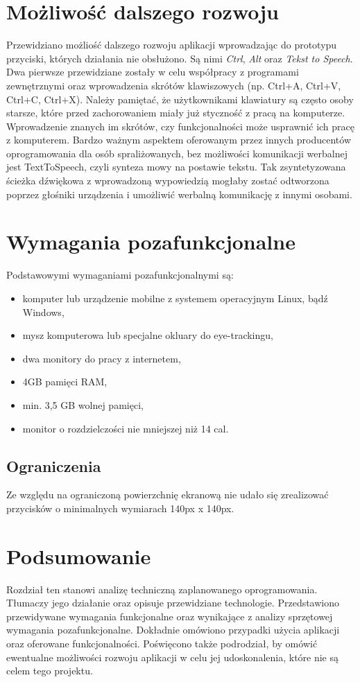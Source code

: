 \documentclass[twoside,a4paper]{book}
\begin{document}
\section{Możliwość dalszego rozwoju} \label{sec:whatMore}
Przewidziano możliość dalszego rozwoju aplikacji wprowadzając do prototypu przyciski, których działania nie obsłużono. Są nimi \textit{Ctrl}, \textit{Alt} oraz \textit{Tekst to Speech}. Dwa pierwsze przewidziane zostały w celu współpracy z programami zewnętrznymi oraz wprowadzenia  skrótów klawiszowych (np. Ctrl+A, Ctrl+V, Ctrl+C, Ctrl+X). Należy pamiętać, że użytkownikami klawiatury są często osoby starsze, które przed zachorowaniem miały już styczność z pracą na komputerze. Wprowadzenie znanych im skrótów, czy funkcjonalności może usprawnić ich pracę z komputerem. Bardzo ważnym aspektem oferowanym przez innych producentów oprogramowania dla osób spraliżowanych, bez możliwości komunikacji werbalnej jest TextToSpeech, czyli synteza mowy na postawie tekstu. Tak zsyntetyzowana ścieżka dźwiękowa z wprowadzoną wypowiedzią mogłaby zostać odtworzona poprzez głośniki urządzenia i umożliwić werbalną komunikację z innymi osobami.
\section{Wymagania pozafunkcjonalne}
Podstawowymi wymaganiami pozafunkcjonalnymi są:
\begin{itemize}
\item komputer lub urządzenie mobilne z systemem operacyjnym Linux, bądź Windows,
\item mysz komputerowa lub specjalne okluary do eye-trackingu,
\item dwa monitory do pracy z internetem, 
\item 4GB pamięci RAM, 
\item min. 3,5 GB wolnej pamięci,
\item monitor o rozdzielczości nie mniejszej niż 14 cal.
\end{itemize} 


\subsection{Ograniczenia}
Ze względu na ograniczoną powierzchnię ekranową nie udało się zrealizować przycisków o minimalnych wymiarach 140px x 140px. 

\section{Podsumowanie}
Rozdział ten stanowi analizę techniczną zaplanowanego oprogramowania. Tłumaczy jego działanie oraz opisuje przewidziane technologie. Przedstawiono przewidywane wymagania funkcjonalne oraz wynikające z analizy sprzętowej wymagania pozafunkcjonalne. Dokładnie omówiono przypadki użycia aplikacji oraz oferowane funkcjonalności. Poświęcono także podrodział, by omówić ewentualne możliwości rozwoju aplikacji w celu jej udoskonalenia, które nie są celem tego projektu.
\end{document}
